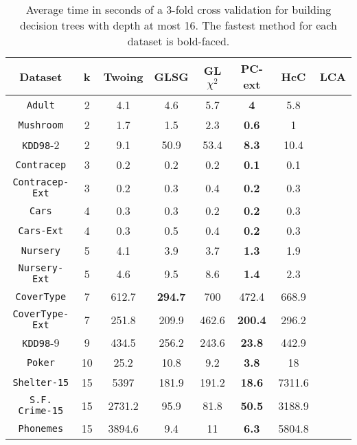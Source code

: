 \begin{table}[]
\small
\centering
\begin{tabular}{c|c|c|c|c|c|c|c}
Dataset             & k  & Twoing        & GLSG      & GL$\chi^2$  & PC-ext    & HcC    & LCA    \\
\hline
{\tt Adult}         & 2  & 4.1           & 4.6       & 5.7         &{\bf 4}    & 5.8    &        \\
{\tt Mushroom}      & 2  & 1.7           & 1.5       & 2.3         &{\bf 0.6}  & 1      &        \\
{\tt KDD98}-2       & 2  & 9.1           & 50.9      & 53.4        &{\bf 8.3}  & 10.4   &        \\
{\tt Contracep}     & 3  & 0.2           & 0.2       & 0.2         &{\bf 0.1}  & 0.1    &        \\
{\tt Contracep-Ext} & 3  & 0.2           & 0.3       & 0.4         &{\bf 0.2}  & 0.3    &        \\
{\tt Cars}          & 4  & 0.3           & 0.3       & 0.2         &{\bf 0.2}  & 0.3    &        \\
{\tt Cars-Ext}      & 4  & 0.3           & 0.5       & 0.4         &{\bf 0.2}  & 0.3    &        \\
{\tt Nursery}       & 5  & 4.1           & 3.9       & 3.7         &{\bf 1.3}  & 1.9    &        \\
{\tt Nursery-Ext}   & 5  & 4.6           & 9.5       & 8.6         &{\bf 1.4}  & 2.3    &        \\
{\tt CoverType}     & 7  & 612.7         &{\bf 294.7}& 700         & 472.4     & 668.9  &        \\
{\tt CoverType-Ext} & 7  & 251.8         & 209.9     & 462.6       &{\bf 200.4}& 296.2  &        \\
{\tt KDD98}-9       & 9  & 434.5         & 256.2     & 243.6       &{\bf 23.8} & 442.9  &        \\
{\tt Poker}         & 10 & 25.2          & 10.8      & 9.2         &{\bf 3.8}  & 18     &        \\
{\tt Shelter-15}    & 15 & 5397          & 181.9     & 191.2       &{\bf 18.6} & 7311.6 &        \\
{\tt S.F. Crime-15} & 15 & 2731.2        & 95.9      & 81.8        &{\bf 50.5} & 3188.9 &        \\
{\tt Phonemes}      & 15 & 3894.6        & 9.4       & 11          &{\bf 6.3}  & 5804.8
\end{tabular}
\caption{Average time in seconds of a 3-fold cross validation
for building decision trees with depth at most 16.
The fastest method for each dataset is bold-faced.}
\label{tab:time-16}
\end{table}


